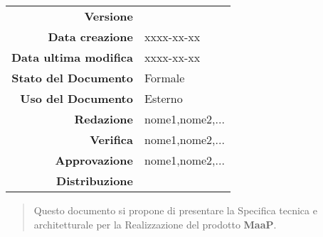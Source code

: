 


\newcommand{\Versione}{\versioneSpecificaTecnica{}}	  %
\newcommand{\Data}{xxxx-xx-xx}				           %
\newcommand{\DataUltimaModifica}{xxxx-xx-xx}
\newcommand{\TipoDocumento}{Specifica Tecnica}	       %




\begin{center}
\begin{tabular}{r|l}
\textbf{Versione} & \Versione{} \\
\textbf{Data creazione} & \Data{} \\
\textbf{Data ultima modifica} & \DataUltimaModifica{} \\
\textbf{Stato del Documento} & Formale \\		          %
\textbf{Uso del Documento} & Esterno \\			          %
\textbf{Redazione} &  nome1,nome2,...\\		        %
\textbf{Verifica} & nome1,nome2,...\\			        %
\textbf{Approvazione} & nome1,nome2,...\\				 %
\textbf{Distribuzione} & \parbox[t]{4cm}{\NomeGruppo{}}\\
\end{tabular}
\end{center}

\vspace{0.05in}

\begin{abstract}
\begin{center}
Questo documento si propone di presentare la Specifica tecnica e architetturale per la Realizzazione del prodotto \textbf{MaaP}.
\end{center}
\end{abstract}

